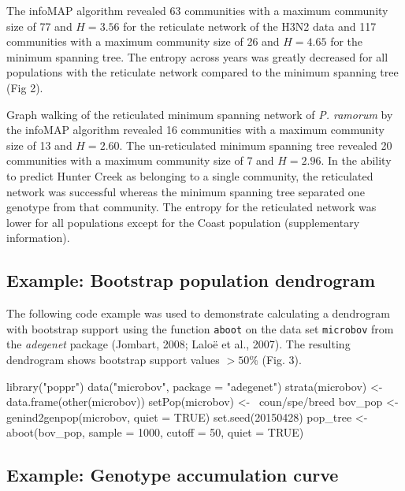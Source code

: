 \documentclass{frontiersSCNS} %
\newenvironment{CodeChunk}{}{}
\begin{document}
The infoMAP algorithm revealed 63 communities with a maximum community
size of 77 and \(H = 3.56\) for the reticulate network of the H3N2 data
and 117 communities with a maximum community size of 26 and \(H = 4.65\)
for the minimum spanning tree. The entropy across years was greatly
decreased for all populations with the reticulate network compared to
the minimum spanning tree (Fig 2).

Graph walking of the reticulated minimum spanning network of \emph{P.
ramorum} by the infoMAP algorithm revealed 16 communities with a maximum
community size of 13 and \(H = 2.60\). The un-reticulated minimum
spanning tree revealed 20 communities with a maximum community size of 7
and \(H = 2.96\). In the ability to predict Hunter Creek as belonging to
a single community, the reticulated network was successful whereas the
minimum spanning tree separated one genotype from that community. The
entropy for the reticulated network was lower for all populations except
for the Coast population (supplementary information).

\subsection*{Example: Bootstrap population
dendrogram}\label{example-bootstrap-population-dendrogram}

The following code example was used to demonstrate calculating a
dendrogram with bootstrap support using the function \texttt{aboot} on
the data set \texttt{microbov} from the \emph{adegenet} package
(Jombart, 2008; Lalo{ë} et al., 2007). The resulting dendrogram shows
bootstrap support values \(>50\%\) (Fig. 3).

\begin{CodeChunk}
\begin{CodeInput}
library("poppr")
data("microbov", package = "adegenet") 
strata(microbov) <- data.frame(other(microbov)) 
setPop(microbov) <- ~coun/spe/breed 
bov_pop <- genind2genpop(microbov, quiet = TRUE) 
set.seed(20150428)
pop_tree <- aboot(bov_pop, sample = 1000, cutoff = 50, quiet = TRUE)
\end{CodeInput}
\end{CodeChunk}

\subsection*{Example: Genotype accumulation
curve}\label{example-genotype-accumulation-curve}
\end{document}

